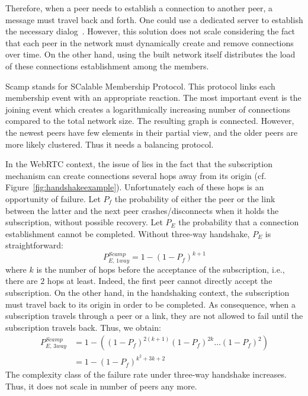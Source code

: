 Therefore, when a peer needs to establish a connection to another
peer, a message must travel back and forth. One could use a dedicated
server to establish the necessary dialog~\cite{peerjs}. However, this
solution does not scale considering the fact that each peer in the
network must dynamically create and remove connections over time. On
the other hand, using the built network itself distributes the load of
these connections establishment among the members.

\begin{asparadesc}
\item [Scamp]\cite{ganesh2001scamp,ganesh2003peer} stands for SCalable
  Membership Protocol. This protocol links each membership event with an
  appropriate reaction.  The most important event is the joining event which
  creates a logarithmically increasing number of connections compared to the
  total network size. The resulting graph is connected. However, the newest
  peers have few elements in their partial view, and the older peers are more
  likely clustered. Thus it needs a balancing protocol.

  In the WebRTC context, the issue of \SCAMP{} lies in the fact that the
  subscription mechanism can create connections several hops away from its
  origin (cf. Figure~\ref{fig:handshakeexample}). Unfortunately each of these
  hops is an opportunity of failure. Let $P_f$ the probability of either the
  peer or the link between the latter and the next peer crashes/disconnects
  when it holds the subscription, without possible recovery. Let $P_E$ the
  probability that a connection establishment cannot be completed. Without
  three-way handshake, $P_E$ is straightforward:
  \begin{equation} P_{E,\,1way}^{Scamp}=1-(1- P_f)^{k+1} \end{equation} where
  $k$ is the number of hops before the acceptance of the subscription, i.e.,
  there are $2$ hops at least. Indeed, the first peer cannot directly accept
  the subscription. On the other hand, in the handshaking context, the
  subscription must travel back to its origin in order to be completed. As
  consequence, when a subscription travels through a peer or a link, they are
  not allowed to fail until the subscription travels back. Thus, we obtain:
  \begin{align} P_{E,\,3way}^{Scamp} &=1 - ((1-P_f)^{2(k+1)} (1-P_f)^{2k}
                                       \ldots (1-P_f)^2) \nonumber \\
                                     &=1-(1-P_f)^{k^2+3k+2}
  \end{align}
  The complexity class of the \SCAMP{} failure rate under three-way handshake
  increases. Thus, it does not scale in number of peers any more.
\end{asparadesc}


